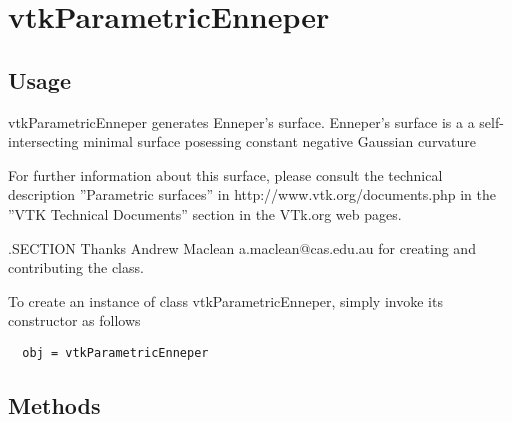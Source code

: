 \section{vtkParametricEnneper}

\subsection{Usage}

 vtkParametricEnneper generates Enneper's surface.
 Enneper's surface is a a self-intersecting minimal surface
 posessing constant negative Gaussian curvature

 For further information about this surface, please consult the 
 technical description ''Parametric surfaces'' in http://www.vtk.org/documents.php 
 in the ''VTK Technical Documents'' section in the VTk.org web pages.

 .SECTION Thanks
 Andrew Maclean a.maclean@cas.edu.au for 
 creating and contributing the class.


To create an instance of class vtkParametricEnneper, simply
invoke its constructor as follows
\begin{verbatim}
  obj = vtkParametricEnneper
\end{verbatim}
\subsection{Methods}

